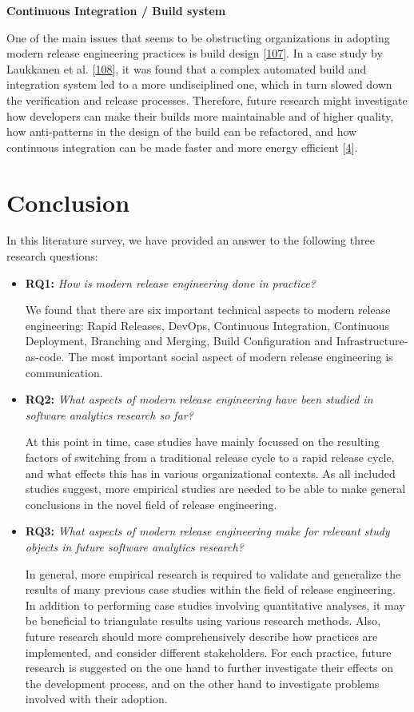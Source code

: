 \documentclass[]{book}
\begin{document}
\textbf{Continuous Integration / Build system}

One of the main issues that seems to be obstructing organizations in
adopting modern release engineering practices is build design
{[}\protect\hyperlink{ref-laukkanen2017a}{107}{]}. In a case study by
Laukkanen et al. {[}\protect\hyperlink{ref-laukkanen2018a}{108}{]}, it
was found that a complex automated build and integration system led to a
more undisciplined one, which in turn slowed down the verification and
release processes. Therefore, future research might investigate how
developers can make their builds more maintainable and of higher
quality, how anti-patterns in the design of the build can be refactored,
and how continuous integration can be made faster and more energy
efficient {[}\protect\hyperlink{ref-adams2016a}{4}{]}.

\section{Conclusion}\label{conclusion-1}

In this literature survey, we have provided an answer to the following
three research questions:

\begin{itemize}
\item
  \textbf{RQ1:} \emph{How is modern release engineering done in
  practice?}

  We found that there are six important technical aspects to modern
  release engineering: Rapid Releases, DevOps, Continuous Integration,
  Continuous Deployment, Branching and Merging, Build Configuration and
  Infrastructure-as-code. The most important social aspect of modern
  release engineering is communication.
\item
  \textbf{RQ2:} \emph{What aspects of modern release engineering have
  been studied in software analytics research so far?}

  At this point in time, case studies have mainly focussed on the
  resulting factors of switching from a traditional release cycle to a
  rapid release cycle, and what effects this has in various
  organizational contexts. As all included studies suggest, more
  empirical studies are needed to be able to make general conclusions in
  the novel field of release engineering.
\item
  \textbf{RQ3:} \emph{What aspects of modern release engineering make
  for relevant study objects in future software analytics research?}

  In general, more empirical research is required to validate and
  generalize the results of many previous case studies within the field
  of release engineering. In addition to performing case studies
  involving quantitative analyses, it may be beneficial to triangulate
  results using various research methods. Also, future research should
  more comprehensively describe how practices are implemented, and
  consider different stakeholders. For each practice, future research is
  suggested on the one hand to further investigate their effects on the
  development process, and on the other hand to investigate problems
  involved with their adoption.
\end{itemize}
\end{document}
